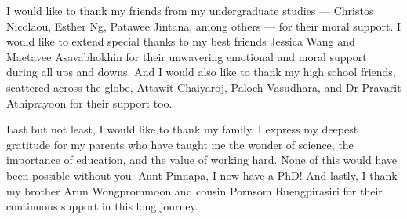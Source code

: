 {  I would like to thank my friends from my undergraduate studies --- Christos Nicolaou, Esther Ng, Patawee Jintana, among others --- for their moral support.
  I would like to extend special thanks to my best friends Jessica Wang and Maetavee Asavabhokhin for their unwavering emotional and moral support during all ups and downs.
  And I would also like to thank my high school friends, scattered across the globe, Attawit Chaiyaroj, Paloch Vasudhara, and Dr Pravarit Athiprayoon for their support too.

  Last but not least, I would like to thank my family.
  I express my deepest gratitude for my parents who have taught me the wonder of science, the importance of education, and the value of working hard.
  None of this would have been possible without you.
  Aunt Pinnapa, I now have a PhD\@!
  And lastly, I thank my brother Arun Wongprommoon and cousin Pornsom Ruengpirasiri for their continuous support in this long journey.
}






